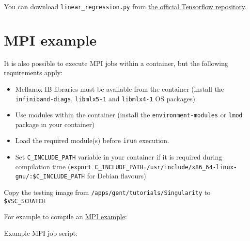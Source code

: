 You can download \lstinline|linear_regression.py| from
\href{https://github.com/tensorflow/tensorflow/blob/master/tensorflow/examples/get_started/regression/linear_regression.py}{the official Tensorflow repository}.

\section{MPI example}

It is also possible to execute MPI jobs within a container, but the following requirements apply:

\begin{itemize}
    \item Mellanox IB libraries must be available from the container (install the \lstinline|infiniband-diags|, \lstinline|libmlx5-1| and \lstinline|libmlx4-1| OS packages)
    \item Use modules within the container (install the \lstinline|environment-modules| or \lstinline|lmod| package in your container)
    \item Load the required module(s) before \lstinline|irun| execution.
    \item Set \lstinline|C_INCLUDE_PATH| variable in your container if it is required during
        compilation time (\lstinline|export C_INCLUDE_PATH=/usr/include/x86_64-linux-gnu/:$C_INCLUDE_PATH| for Debian flavours)
\end{itemize}

Copy the testing image from \lstinline|/apps/gent/tutorials/Singularity| to \lstinline|$VSC_SCRATCH|

\begin{prompt}
\end{prompt}

For example to compile an
\href{https://github.com/open-mpi/ompi/blob/master/examples/ring_c.c}{MPI example}:

\begin{prompt}
\end{prompt}

Example MPI job script:

